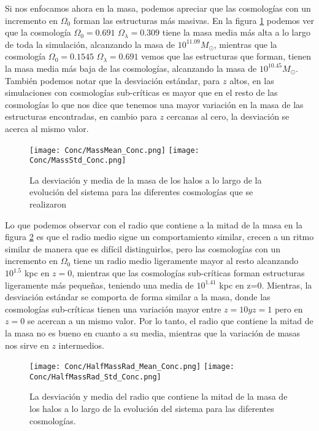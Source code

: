 Si nos enfocamos ahora en la masa, podemos apreciar que las cosmologías con un incremento en $\Omega_0$ forman las estructuras más masivas. En la figura \ref{fig:Conc_Mass} podemos ver que la cosmología $\Omega_0=0.691$ $\Omega_\lambda=0.309$ tiene la masa media más alta a lo largo de toda la simulación, alcanzando la masa de $10^{11.09}M_\odot$, mientras que la cosmología $\Omega_0=0.1545$ $\Omega_\lambda=0.691$ vemos que las estructuras que forman, tienen la masa media más baja de las cosmologías, alcanzando la masa de $10^{10.45} M_\odot$. También podemos notar que la desviación estándar, para $z$ altos, en las simulaciones con cosmologías sub-críticas es mayor que en el resto de las cosmologías lo que nos dice que tenemos una mayor variación en la masa de las estructuras encontradas, en cambio para $z$ cercanas al cero, la desviación se acerca al mismo valor.
\begin{figure}[H]
      \centering
      \texttt{[image: Conc/MassMean\_Conc.png]}
      \texttt{[image: Conc/MassStd\_Conc.png]}
      \caption[Evolución de la desviación y media de la masa de los halos para todas las cosmologías]{La desviación y media de la masa de los halos a lo largo de la evolución del sistema para las diferentes cosmologías que se realizaron}
      \label{fig:Conc_Mass}
\end{figure}

Lo que podemos observar con el radio que contiene a la mitad de la masa en la figura \ref{fig:Conc_HalfMassRad} es que el radio medio sigue un comportamiento similar, crecen a un ritmo similar de manera que es difícil distinguirlos, pero las cosmologías con un incremento en $\Omega_0$ tiene un radio medio ligeramente mayor al resto alcanzando $10^{1.5}$ kpc en $z=0$, mientras que las cosmologías sub-críticas forman estructuras ligeramente más pequeñas, teniendo una media de $10^{1.41}$ kpc en z=0. Mientras, la desviación estándar se comporta de forma similar a la masa, donde las cosmologías sub-críticas tienen una variación mayor entre $z=10 y z=1$ pero en $z=0$ se acercan a un mismo valor. Por lo tanto, el radio que contiene la mitad de la masa no es bueno en cuanto a su media, mientras que la variación de masas nos sirve en $z$ intermedios.

\begin{figure}[H]
      \centering
      \texttt{[image: Conc/HalfMassRad\_Mean\_Conc.png]}
      \texttt{[image: Conc/HalfMassRad\_Std\_Conc.png]}
      \caption[Evolución de la desviación y media del radio que contiene la mitad de la masa de los halos para todas las cosmologías]{La desviación y media del radio que contiene la mitad de la masa de los halos a lo largo de la evolución del sistema para las diferentes cosmologías.}
      \label{fig:Conc_HalfMassRad}
\end{figure}

